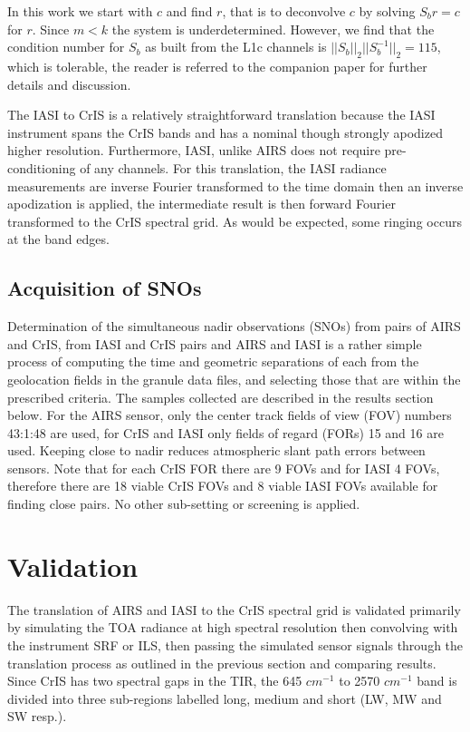 \documentclass[twocolumn,10pt]{article}
\begin{document}
In this work we start with $c$ and find $r$, that is
to deconvolve $c$ by solving $S_b r = c$ for $r$.  Since $m < k$ the
system is underdetermined. However, we find that the condition number for $S_b$
as built from the L1c channels is $||S_b||_2||S_b^{-1}||_2 = 115$,
which is tolerable, the reader is referred to the companion paper \cite{Motteler2017a} for further details and discussion.

The IASI to CrIS is a relatively straightforward translation because the IASI instrument spans the CrIS bands and has a nominal though strongly apodized higher resolution. Furthermore, IASI, unlike AIRS does not require pre-conditioning of any channels. For this translation, the IASI radiance measurements are inverse Fourier transformed to the time domain then an inverse apodization is applied, the intermediate result is then forward Fourier transformed to the CrIS spectral grid. As would be expected, some ringing occurs at the band edges.

\subsection{Acquisition of SNOs}

Determination of the simultaneous nadir observations (SNOs) from pairs of AIRS and CrIS, from IASI and CrIS pairs and AIRS and IASI is a rather simple process of computing the time and geometric separations of each from the geolocation fields in the granule data files, and selecting those that are within the prescribed criteria. The samples collected are described in the results section below. For the AIRS sensor, only the center track fields of view (FOV) numbers 43:1:48 are used, for CrIS and IASI only fields of regard (FORs) 15 and 16 are used. Keeping close to nadir reduces atmospheric slant path errors between sensors. Note that for each CrIS FOR there are 9 FOVs and for IASI 4 FOVs, therefore there are 18 viable CrIS FOVs and 8 viable IASI FOVs available for finding close pairs. No other sub-setting or screening is applied.

\section{Validation}

The translation of AIRS and IASI to the CrIS spectral grid is validated primarily by simulating the TOA radiance at high spectral resolution then convolving with the instrument SRF or ILS, then passing the simulated sensor signals through the translation process as outlined in the previous section and comparing results. Since CrIS has two spectral gaps in the TIR, the  645 $cm^{-1}$ to 2570 $cm^{-1}$ band is divided into three sub-regions labelled long, medium and short (LW, MW and SW resp.).
\end{document}
